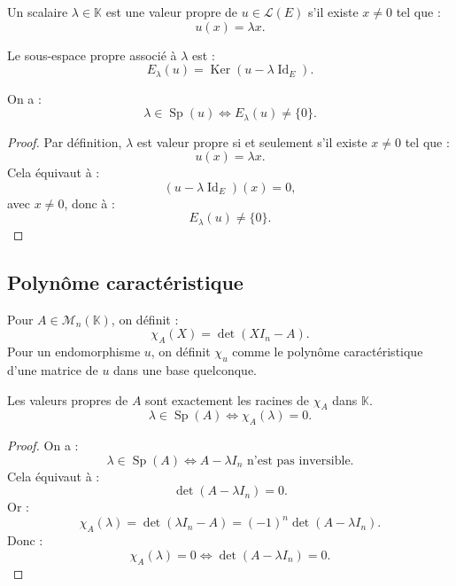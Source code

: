 \documentclass[11pt,a4paper]{article}
\newcommand{\K}{\mathbb K}
\newcommand{\M}{\mathcal M}
\newcommand{\Lcal}{\mathcal L}
\newcommand{\Ker}{\operatorname{Ker}}
\newcommand{\Id}{\operatorname{Id}}
\newcommand{\Sp}{\operatorname{Sp}}
\begin{document}
\begin{definitionbox}
Un scalaire \(\lambda\in\K\) est une valeur propre de \(u\in\Lcal(E)\) s'il existe \(x\neq0\) tel que :
\[
u(x)=\lambda x.
\]
\end{definitionbox}

\begin{definitionbox}
Le sous-espace propre associé à \(\lambda\) est :
\[
E_\lambda(u)=\Ker(u-\lambda\Id_E).
\]
\end{definitionbox}

\begin{theorembox}
On a :
\[
\lambda\in\Sp(u)
\Longleftrightarrow
E_\lambda(u)\neq\{0\}.
\]
\end{theorembox}

\begin{proof}
Par définition, \(\lambda\) est valeur propre si et seulement s'il existe \(x\neq0\) tel que :
\[
u(x)=\lambda x.
\]
Cela équivaut à :
\[
(u-\lambda\Id_E)(x)=0,
\]
avec \(x\neq0\), donc à :
\[
E_\lambda(u)\neq\{0\}.
\]
\end{proof}

\subsection{Polynôme caractéristique}

\begin{definitionbox}
Pour \(A\in\M_n(\K)\), on définit :
\[
\chi_A(X)=\det(XI_n-A).
\]
Pour un endomorphisme \(u\), on définit \(\chi_u\) comme le polynôme caractéristique d'une matrice de \(u\) dans une base quelconque.
\end{definitionbox}

\begin{theorembox}
Les valeurs propres de \(A\) sont exactement les racines de \(\chi_A\) dans \(\K\).
\[
\lambda\in\Sp(A)
\Longleftrightarrow
\chi_A(\lambda)=0.
\]
\end{theorembox}

\begin{proof}
On a :
\[
\lambda\in\Sp(A)
\Longleftrightarrow
A-\lambda I_n \text{ n'est pas inversible}.
\]
Cela équivaut à :
\[
\det(A-\lambda I_n)=0.
\]
Or :
\[
\chi_A(\lambda)=\det(\lambda I_n-A)=(-1)^n\det(A-\lambda I_n).
\]
Donc :
\[
\chi_A(\lambda)=0
\Longleftrightarrow
\det(A-\lambda I_n)=0.
\]
\end{proof}

\end{document}
